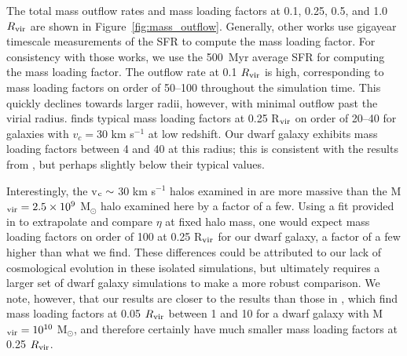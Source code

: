 \documentclass[twocolumn]{aastex61}
\begin{document}
The total mass outflow rates and mass loading factors at 0.1, 0.25, 0.5, and 1.0 $R_{\rm vir}$ are shown in Figure~\ref{fig:mass_outflow}. Generally, other works use gigayear timescale measurements of the SFR to compute the mass loading factor. For consistency with those works, we use the 500~Myr average SFR for computing the mass loading factor. The outflow rate at 0.1 $R_{\rm vir}$ is high, corresponding to mass loading factors on order of 50--100 throughout the simulation time. This quickly declines towards larger radii, however, with minimal outflow past the virial radius. \citet{Muratov2015} finds typical mass loading factors at 0.25 R$_{\rm vir}$ on order of 20--40 for galaxies with $v_{c} = 30$ km s$^{-1}$ at low redshift. Our dwarf galaxy exhibits mass loading factors between 4 and 40 at this radius; this is consistent with the results from \citet{Muratov2015}, but perhaps slightly below their typical values. 

Interestingly, the v$_{\rm c}\sim$ 30 km s$^{-1}$ halos examined in \citet{Muratov2015} are more massive than the M$_{\rm vir} = 2.5\times 10^9$ M$_{\odot}$ halo examined here by a factor of a few. Using a fit provided in \citet{Muratov2015} to extrapolate and compare $\eta$ at fixed halo mass, one would expect mass loading factors on order of 100 at 0.25 R$_{\rm vir}$ for our dwarf galaxy, a factor of a few higher than what we find. These differences could be attributed to our lack of cosmological evolution in these isolated simulations, but ultimately requires a larger set of dwarf galaxy simulations to make a more robust comparison. We note, however, that our results are closer to the \citet{Muratov2015} results than those in \citet{Hu2016,Hu2017}, which find mass loading factors at 0.05 $R_{\rm vir}$ between 1 and 10 for a dwarf galaxy with M$_{\rm vir} = 10^{10}$ M$_{\odot}$, and therefore certainly have much smaller mass loading factors at 0.25 $R_{\rm vir}$.
\end{document}
